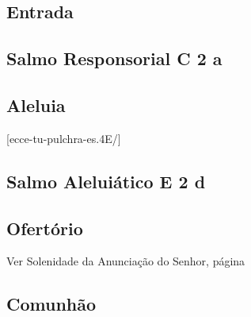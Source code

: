 
\subsection{Entrada}\label{subsection:proprium-sanctorum/in-conceptione-immaculata-bmv/introitus}

\AllowPageFlush

\subsection[Salmo Responsorial]{Salmo Responsorial \textmd{C 2 a}}\label{subsection:proprium-sanctorum/in-conceptione-immaculata-bmv/psalmus-responsorius}

\AllowPageFlush

\subsection{Aleluia}\label{subsection:proprium-sanctorum/in-conceptione-immaculata-bmv/alleluia}
[ecce-tu-pulchra-es.4E/]

\AllowPageFlush

\subsection[Salmo Aleluiático]{Salmo Aleluiático \textmd{E 2 d}}\label{subsection:proprium-sanctorum/in-conceptione-immaculata-bmv/psalmus-alleluiaticus}

\AllowPageFlush

\subsection{Ofertório}\label{subsection:proprium-sanctorum/in-conceptione-immaculata-bmv/offertorium}

\begin{rubrica}
  Ver Solenidade da Anunciação do Senhor, pági\-na~\pageref{subsection:proprium-sanctorum/in-annuntiatione-domini/offertorium}
\end{rubrica}

\AllowPageFlush

\subsection{Comunhão}\label{subsection:proprium-sanctorum/in-conceptione-immaculata-bmv/communio}
